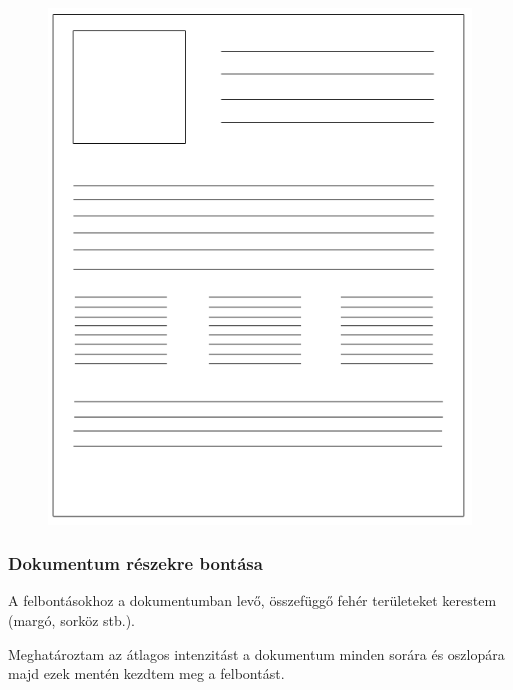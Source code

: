 \documentclass{beamer}
\begin{document}
\begin{frame}[fragile]
\begin{figure}[!tbp]
\begin{minipage}[b]{0.45\textwidth}
    \includegraphics[width=\textwidth]{images/page_complicated.png}
  \end{minipage}
\end{figure}

\end{frame}

\begin{frame}[fragile]
\frametitle{Dokumentum részekre bontása}

A felbontásokhoz a dokumentumban levő, összefüggő fehér területeket kerestem (margó, sorköz stb.).

\bigskip

Meghatároztam az átlagos intenzitást a dokumentum minden sorára és oszlopára majd ezek mentén kezdtem meg a felbontást.

\end{frame}
\end{document}
